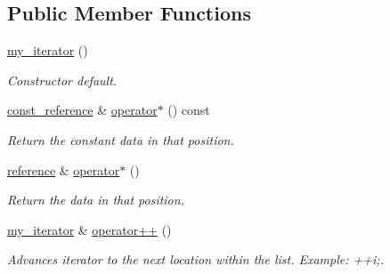 \subsection*{Public Member Functions}
\begin{DoxyCompactItemize}
\item 
\mbox{\label{classls_1_1my__iterator_ac18d9ac910a22e6b294edaecf86bfd19}} 
\hyperlink{classls_1_1my__iterator_ac18d9ac910a22e6b294edaecf86bfd19}{my\+\_\+iterator} ()
\begin{DoxyCompactList}\small\item\em Constructor default. \end{DoxyCompactList}\item 
\mbox{\label{classls_1_1my__iterator_ab8ae439a58cd299cbd364b3edf1dd855}} 
\hyperlink{classls_1_1my__const__iterator_a47552bc9ef18669651047b1741c7ed42}{const\+\_\+reference} \& \hyperlink{classls_1_1my__iterator_ab8ae439a58cd299cbd364b3edf1dd855}{operator$\ast$} () const
\begin{DoxyCompactList}\small\item\em Return the constant data in that position. \end{DoxyCompactList}\item 
\mbox{\label{classls_1_1my__iterator_a3eec7197d3d2b31cea843bc41b28451e}} 
\hyperlink{classls_1_1my__iterator_ad3b5d3648d5b83344888204a9e6d7bfa}{reference} \& \hyperlink{classls_1_1my__iterator_a3eec7197d3d2b31cea843bc41b28451e}{operator$\ast$} ()
\begin{DoxyCompactList}\small\item\em Return the data in that position. \end{DoxyCompactList}\item 
\mbox{\label{classls_1_1my__iterator_aa958375bc05acb1767e82e69373c9a25}} 
\hyperlink{classls_1_1my__iterator}{my\+\_\+iterator} \& \hyperlink{classls_1_1my__iterator_aa958375bc05acb1767e82e69373c9a25}{operator++} ()
\begin{DoxyCompactList}\small\item\em Advances iterator to the next location within the list. Example\+: ++i;. \end{DoxyCompactList}\item 
\mbox{\label{classls_1_1my__iterator_a87cd11c26f7cff8fb68631d100354143}} 

\end{DoxyCompactItemize}

